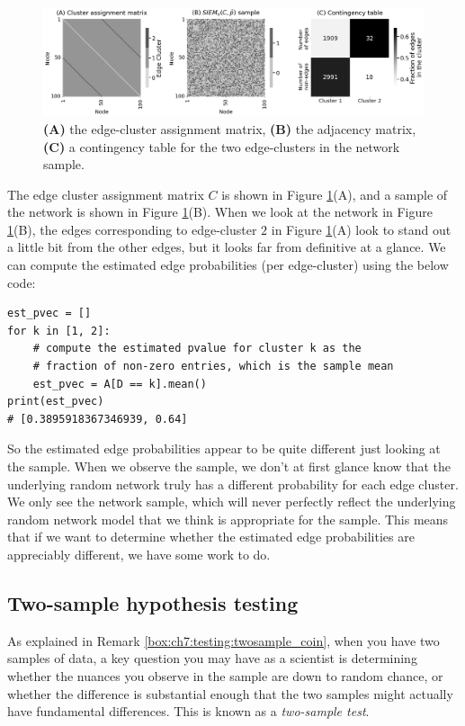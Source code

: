 \begin{figure}
    \centering
    \includegraphics[width=\linewidth]{applications/ch7/Images/testing_siem_ex.png}
    \caption[SIEM Testing]{\textbf{(A)} the edge-cluster assignment matrix, \textbf{(B)} the adjacency matrix, \textbf{(C)} a contingency table for the two edge-clusters in the network sample.}
    \label{fig:ch7:testing:siem_ex}
\end{figure}
The edge cluster assignment matrix $C$ is shown in Figure \ref{fig:ch7:testing:siem_ex}(A), and a sample of the network is shown in Figure \ref{fig:ch7:testing:siem_ex}(B). When we look at the network in Figure \ref{fig:ch7:testing:siem_ex}(B), the edges corresponding to edge-cluster $2$ in Figure \ref{fig:ch7:testing:siem_ex}(A) look to stand out a little bit from the other edges, but it looks far from definitive at a glance. We can compute the estimated edge probabilities (per edge-cluster) using the below code:

\begin{lstlisting}[style=python]
est_pvec = []
for k in [1, 2]:
    # compute the estimated pvalue for cluster k as the 
    # fraction of non-zero entries, which is the sample mean
    est_pvec = A[D == k].mean()
print(est_pvec)
# [0.3895918367346939, 0.64]
\end{lstlisting}
So the estimated edge probabilities appear to be quite different just looking at the sample. When we observe the sample, we don't at first glance know that the underlying random network truly has a different probability for each edge cluster. We only see the network sample, which will never perfectly reflect the underlying random network model that we think is appropriate for the sample. This means that if we want to determine whether the estimated edge probabilities are appreciably different, we have some work to do.

\subsection{Two-sample hypothesis testing}
\label{sec:ch7:testing:twosample}
As explained in Remark \ref{box:ch7:testing:twosample_coin}, when you have two samples of data, a key question you may have as a scientist is determining whether the nuances you observe in the sample are down to random chance, or whether the difference is substantial enough that the two samples might actually have fundamental differences. This is known as a \textit{two-sample test}.

